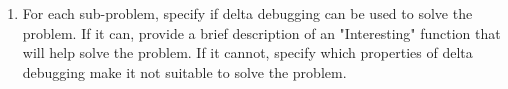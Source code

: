 \documentclass{report}
\newif\ifkey
\newcommand{\answerlong}[1]{\ifkey\color{red}\textbf{#1}\color{black}\else\vspace{0.5in}\fi\xspace}
\newcommand*{\pts}[1]{\addtocounter{points}{#1}(#1pt)}
\begin{document}
\begin{spacing}{1.4}
\begin{enumerate}[leftmargin=*]




  \item For each sub-problem, specify if delta debugging can be used
    to solve the problem. If it can, provide a brief description of an "Interesting" function that will help solve the problem. If it
    cannot, specify which properties of delta debugging make it not suitable to solve the problem.
    \begin{enumerate}


\end{enumerate}
\end{enumerate}
\end{spacing}
\end{document}

